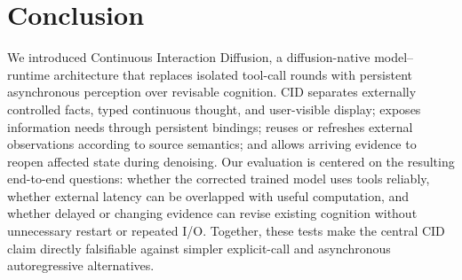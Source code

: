 \section{Conclusion}
\label{sec:conclusion}

We introduced Continuous Interaction Diffusion, a diffusion-native model--runtime architecture that replaces isolated tool-call rounds with persistent asynchronous perception over revisable cognition. CID separates externally controlled facts, typed continuous thought, and user-visible display; exposes information needs through persistent bindings; reuses or refreshes external observations according to source semantics; and allows arriving evidence to reopen affected state during denoising. Our evaluation is centered on the resulting end-to-end questions: whether the corrected trained model uses tools reliably, whether external latency can be overlapped with useful computation, and whether delayed or changing evidence can revise existing cognition without unnecessary restart or repeated I/O. Together, these tests make the central CID claim directly falsifiable against simpler explicit-call and asynchronous autoregressive alternatives.
